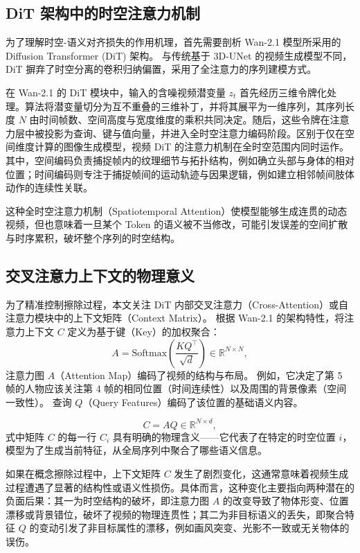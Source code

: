 \subsection{DiT 架构中的时空注意力机制}\label{subsec:spatiotemporal_attention}

为了理解时空-语义对齐损失的作用机理，首先需要剖析 Wan-2.1 模型所采用的 Diffusion Transformer (DiT) 架构。
与传统基于 3D-UNet 的视频生成模型不同，DiT 摒弃了时空分离的卷积归纳偏置，采用了全注意力的序列建模方式。

在 Wan-2.1 的 DiT 模块中，输入的含噪视频潜变量 $z_t$ 首先经历三维令牌化处理。算法将潜变量切分为互不重叠的三维补丁，并将其展平为一维序列，其序列长度 $N$ 由时间帧数、空间高度与宽度维度的乘积共同决定。随后，这些令牌在注意力层中被投影为查询、键与值向量，并进入全时空注意力编码阶段。区别于仅在空间维度计算的图像生成模型，视频 DiT 的注意力机制在全时空范围内同时运作。其中，空间编码负责捕捉帧内的纹理细节与拓扑结构，例如确立头部与身体的相对位置；时间编码则专注于捕捉帧间的运动轨迹与因果逻辑，例如建立相邻帧间肢体动作的连续性关联。

这种全时空注意力机制（Spatiotemporal Attention）使模型能够生成连贯的动态视频，但也意味着一旦某个 Token 的语义被不当修改，可能引发误差的空间扩散与时序累积，破坏整个序列的时空结构。

\subsection{交叉注意力上下文的物理意义}\label{subsec:cross_attention_context}

为了精准控制擦除过程，本文关注 DiT 内部交叉注意力（Cross-Attention）或自注意力模块中的上下文矩阵（Context Matrix）。
根据 Wan-2.1 的架构特性，将注意力上下文 $C$ 定义为基于键（Key）的加权聚合：
\begin{equation}
    A = \text{Softmax}\left(\frac{K Q^\top}{\sqrt{d}}\right) \in \mathbb{R}^{N \times N},
\end{equation}
注意力图 $A$（Attention Map）编码了视频的结构与布局。
例如，它决定了第 5 帧的人物应该关注第 4 帧的相同位置（时间连续性）以及周围的背景像素（空间一致性）。
查询 $Q$（Query Features）编码了该位置的基础语义内容。

\begin{equation}
    C = A Q \in \mathbb{R}^{N \times d},    
\end{equation}
式中矩阵 $C$ 的每一行 $C_i$ 具有明确的物理含义——它代表了在特定的时空位置 $i$，模型为了生成当前特征，从全局序列中聚合了哪些语义信息。

如果在概念擦除过程中，上下文矩阵 $C$ 发生了剧烈变化，这通常意味着视频生成过程遭遇了显著的结构性或语义性损伤。具体而言，这种变化主要指向两种潜在的负面后果：其一为时空结构的破坏，即注意力图 $A$ 的改变导致了物体形变、位置漂移或背景错位，破坏了视频的物理连贯性；其二为非目标语义的丢失，即聚合特征 $Q$ 的变动引发了非目标属性的漂移，例如画风突变、光影不一致或无关物体的误伤。

